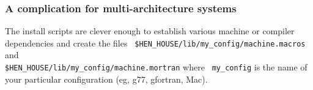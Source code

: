 \subsubsection{A complication for multi-architecture systems}
The install scripts are clever enough to establish various machine or
compiler dependencies and create the files {\tt
\$HEN\_HOUSE/lib/{my\_config}/machine.macros} and\\
 {\tt \$HEN\_HOUSE/lib/{my\_config}/machine.mortran} where {\tt
{my\_config}} is the name of your particular configuration (eg, g77,
gfortran, Mac).

